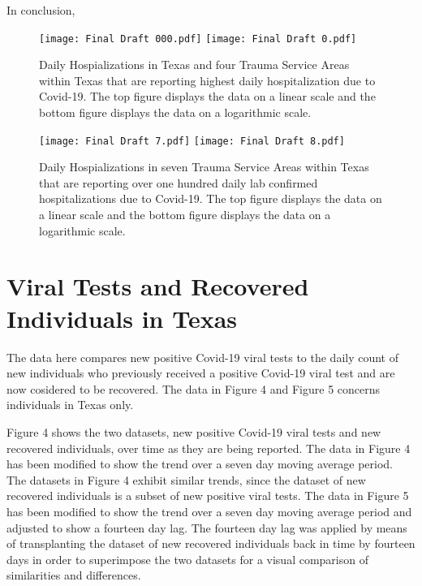 \documentclass{article}
\begin{document}
\vspace{2mm}

In conclusion, 


\begin{figure}[!htbp]
	\begin{center}
		\texttt{[image: Final Draft 000.pdf]}
		\vspace{1mm}
		\texttt{[image: Final Draft 0.pdf]}
		\caption{Daily Hospializations in Texas and four Trauma Service Areas within Texas that are reporting highest daily hospitalization due to Covid-19. The top figure displays the data on a linear scale and the bottom figure displays the data on a logarithmic scale. }
		\label{fig:1}
	\end{center}
\end{figure}

\FloatBarrier

\begin{figure}[!htbp]
	\begin{center}
		\texttt{[image: Final Draft 7.pdf]}
		\vspace{1mm}
		\texttt{[image: Final Draft 8.pdf]}
		\caption{Daily Hospializations in seven Trauma Service Areas within Texas that are reporting over one hundred daily lab confirmed hospitalizations due to Covid-19. The top figure displays the data on a linear scale and the bottom figure displays the data on a logarithmic scale. }
		\label{fig:1}
	\end{center}
\end{figure}

\FloatBarrier

\section{Viral Tests and Recovered Individuals in Texas}

The data here compares new positive Covid-19 viral tests to the daily count of new individuals who previously received a positive Covid-19 viral test and are now cosidered to be recovered. The data in Figure 4 and Figure 5 concerns individuals in Texas only. 

\vspace{2mm}

Figure 4 shows the two datasets, new positive Covid-19 viral tests and new recovered individuals, over time as they are being reported. The data in Figure 4 has been modified to show the trend over a seven day moving average period. The datasets in Figure 4 exhibit similar trends, since the dataset of new recovered individuals is a subset of new positive viral tests. 
The data in Figure 5 has been modified to show the trend over a seven day moving average period and adjusted to show a fourteen day lag. The fourteen day lag was applied by means of transplanting the dataset of new recovered individuals back in time by fourteen days in order to superimpose the two datasets for a visual comparison of similarities and differences.
\end{document}
